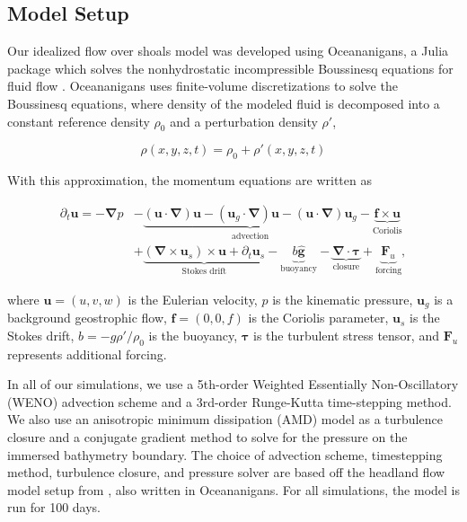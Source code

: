 \subsection{Model Setup}

Our idealized flow over shoals model was developed using Oceananigans, a Julia package which solves the nonhydrostatic incompressible Boussinesq equations for fluid flow \cite{wagner25}. Oceananigans uses finite-volume discretizations to solve the Boussinesq equations, where density of the modeled fluid is decomposed into a constant reference density $\rho_0$ and a perturbation density $\rho'$, 

\begin{equation}
    \rho(x, y, z, t) = \rho_0 + \rho'(x, y, z, t)
\end{equation}

With this approximation, the momentum equations are written as 

\begin{align}
    \partial_t \boldsymbol{u} = - \boldsymbol{\nabla} p & - \underbrace{(\boldsymbol{u} \cdot \boldsymbol{\nabla}) \boldsymbol{u} - (\boldsymbol{u}_g \cdot \boldsymbol{\nabla}) \boldsymbol{u} - (\boldsymbol{u} \cdot \boldsymbol{\nabla}) \boldsymbol{u}_g}_{\text{advection}} - \underbrace{\boldsymbol{f} \times \boldsymbol{u}}_{\text{Coriolis}} \nonumber \\
    & + \underbrace{(\boldsymbol{\nabla} \times \boldsymbol{u}_s) \times \boldsymbol{u} + \partial_t \boldsymbol{u}_s}_{\text{Stokes drift}} - \underbrace{b \boldsymbol{\hat{g}}}_{\text{buoyancy}} - \underbrace{\boldsymbol{\nabla} \cdot \boldsymbol{\tau}}_{\text{closure}} + \underbrace{\boldsymbol{F}_u}_{\text{forcing}} ,
\end{align}

where $\boldsymbol{u} = (u, v, w)$ is the Eulerian velocity, $p$ is the kinematic pressure, $\boldsymbol{u}_g$ is a background geostrophic flow, $\boldsymbol{f} = (0, 0, f)$ is the Coriolis parameter, $\boldsymbol{u}_s$ is the Stokes drift, $b = -g \rho' / \rho_0$ is the buoyancy, $\boldsymbol{\tau}$ is the turbulent stress tensor, and $\boldsymbol{F}_u$ represents additional forcing. 

In all of our simulations, we use a 5th-order Weighted Essentially Non-Oscillatory (WENO) advection scheme and a 3rd-order Runge-Kutta time-stepping method. We also use an anisotropic minimum dissipation (AMD) model as a turbulence closure and a conjugate gradient method to solve for the pressure on the immersed bathymetry boundary. The choice of advection scheme, timestepping method, turbulence closure, and pressure solver are based off the headland flow model setup from \cite{chor25}, also written in Oceananigans. For all simulations, the model is run for 100 days.

